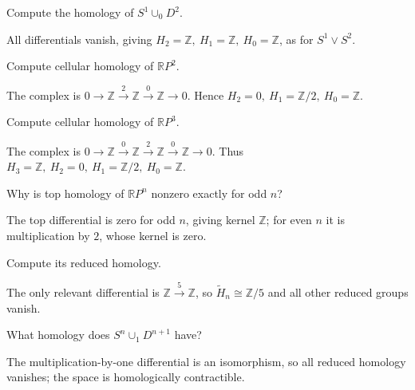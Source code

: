 \begin{problem}\label{prob:viii18-08}
Compute the homology of \(S^1\cup_0D^2\).
\end{problem}
\begin{solution}
All differentials vanish, giving \(H_2=\mathbb Z,\ H_1=\mathbb Z,\ H_0=\mathbb Z\), as for \(S^1\vee S^2\).
\end{solution}

\begin{problem}\label{prob:viii18-09}
Compute cellular homology of \(\mathbb RP^2\).
\end{problem}
\begin{solution}
The complex is \(0\to\mathbb Z\xrightarrow2\mathbb Z\xrightarrow0\mathbb Z\to0\). Hence \(H_2=0,\ H_1=\mathbb Z/2,\ H_0=\mathbb Z\).
\end{solution}

\begin{problem}\label{prob:viii18-10}
Compute cellular homology of \(\mathbb RP^3\).
\end{problem}
\begin{solution}
The complex is \(0\to\mathbb Z\xrightarrow0\mathbb Z\xrightarrow2\mathbb Z\xrightarrow0\mathbb Z\to0\). Thus \(H_3=\mathbb Z,\ H_2=0,\ H_1=\mathbb Z/2,\ H_0=\mathbb Z\).
\end{solution}

\begin{problem}\label{prob:viii18-11}
Why is top homology of \(\mathbb RP^n\) nonzero exactly for odd \(n\)?
\end{problem}
\begin{solution}
The top differential is zero for odd \(n\), giving kernel \(\mathbb Z\); for even \(n\) it is multiplication by \(2\), whose kernel is zero.
\end{solution}

\begin{problem}\label{prob:viii18-12}
Compute its reduced homology.
\end{problem}
\begin{solution}
The only relevant differential is \(\mathbb Z\xrightarrow5\mathbb Z\), so \(\widetilde H_n\cong\mathbb Z/5\) and all other reduced groups vanish.
\end{solution}

\begin{problem}[Moore \(m=1\)]\label{prob:viii18-13}
What homology does \(S^n\cup_1D^{n+1}\) have?
\end{problem}
\begin{solution}
The multiplication-by-one differential is an isomorphism, so all reduced homology vanishes; the space is homologically contractible.
\end{solution}

